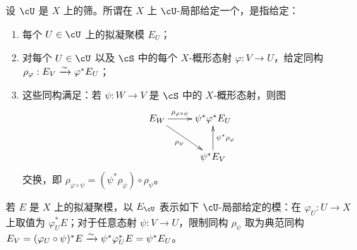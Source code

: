 \subsubsection{}\label{I:1-4-4}
设 $\cU$ 是 $X$ 上的筛。所谓在 $X$ 上 $\cU$-局部给定一个，是指给定：
\begin{enumerate}[\indent a)]
\item 每个 $U\in\cU$ 上的拟凝聚模 $E_U$；
\item 对每个 $U\in\cU$ 以及 $\cS$ 中的每个 $X$-概形态射 $\varphi:V\to U$，给定同构 $\rho_\varphi:E_V\xrightarrow\sim\varphi^*E_U$；
\item 这些同构满足：若 $\psi:W\to V$ 是 $\cS$ 中的 $X$-概形态射，则图
\[\xymatrix{
 E_W\ar[r]^-{\rho_{\varphi\circ\psi}}\ar[dr]_-{\rho_\psi}&\psi^*\varphi^*E_U\\
 &\psi^*E_V\ar[u]_-{\psi^*\rho_\varphi}
}\]
交换，即 $\rho_{\varphi\circ\psi}=(\psi^*\rho_\varphi)\circ\rho_\psi$。
\end{enumerate}

若 $E$ 是 $X$ 上的拟凝聚模，以 $E_\cU$ 表示如下 $\cU$-局部给定的模：在 $\varphi_U:U\to X$ 上取值为 $\varphi_U^*E$；对于任意态射 $\psi:V\to U$，限制同构 $\rho_\psi$ 取为典范同构
$E_V=(\varphi_U\circ\psi)^*E\xrightarrow\sim\psi^*\varphi_U^*E=\psi^*E_U$。

